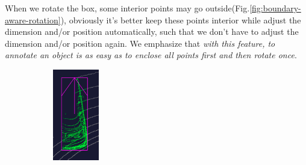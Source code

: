 \documentclass[letterpaper, 10 pt, conference]{ieeeconf}  %
\begin{document}
When we rotate the box, some interior points may go outside(Fig.\ref{fig:boundary-aware-rotation}), obviously it's better keep these points interior while adjust the dimension and/or position automatically, such that we don't have to adjust the dimension and/or position again. We emphasize that \emph{with this feature, to annotate an object is as easy as to enclose all points first and then rotate once}.


\begin{figure}[ht]
	\centering
	\begin{subfigure}[t]{0.2\linewidth}
		\includegraphics[height=4cm]{./figures/points-enclosed}
		\caption{}


\end{subfigure}
\end{figure}
\end{document}
